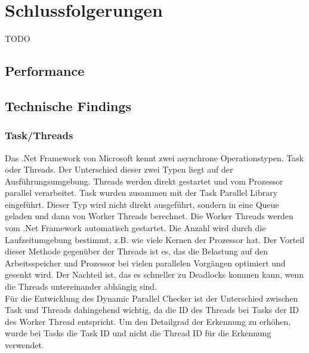 \documentclass[10pt,a4paper]{article}
\begin{document}
\section{Schlussfolgerungen}
TODO\\
\subsection{Performance}
\subsection{Technische Findings}
\subsubsection{Task/Threads}
\begin{flushleft}
Das .Net Framework von Microsoft kennt zwei asynchrone Operationstypen. Task oder Threads. Der Unterschied dieser zwei Typen liegt auf der Ausführungsumgebung. Threads werden direkt gestartet und vom Prozessor parallel verarbeitet. Task wurden zusammen mit der Task Parallel Library eingeführt. Dieser Typ wird nicht direkt ausgeführt, sondern in eine Queue geladen und dann von Worker Threads berechnet. Die Worker Threads werden vom .Net Framework automatisch gestartet. Die Anzahl wird durch die Laufzeitumgebung bestimmt, z.B. wie viele Kernen der Prozessor hat. Der Vorteil dieser Methode gegenüber der Threads ist es, das die Belastung auf den Arbeitsspeicher und Prozessor bei vielen parallelen Vorgängen optimiert und gesenkt wird. Der Nachteil ist, das es schneller zu Deadlocks kommen kann, wenn die Threads untereinander abhängig sind.\\
Für die Entwicklung des Dynamic Parallel Checker ist der Unterschied zwischen Task und Threads dahingehend wichtig, da die ID des Threads bei Tasks der ID des Worker Thread entspricht. Um den Detailgrad der Erkennung zu erhöhen, wurde bei Tasks die Task ID und nicht die Thread ID für die Erkennung verwendet.
\end{flushleft}
\end{document}
